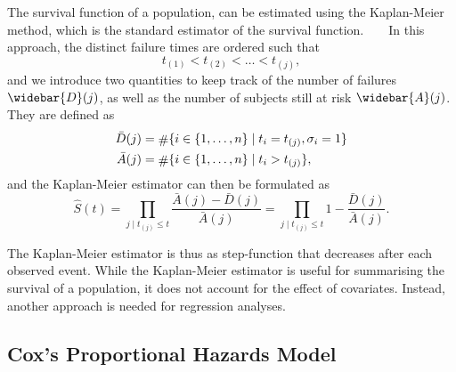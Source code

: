 The survival function of a population,
can be estimated using the Kaplan-Meier method,
which is the standard estimator of the survival function.
~\autocite{kaplan1958nonparametric}
~\autocite{kleinSurvival2003}
In this approach, 
the distinct failure times are ordered such that%
\footnotemark
\begin{equation*}
    t_{(1)} < t_{(2)} < \ldots < t_{(j)},
\end{equation*}
%
and we introduce two quantities to keep track of
the number of failures \(\widebar{D}(j)\), 
as well as the number of subjects still at risk \(\widebar{A}(j)\).
They are defined as
\begin{equation}
\begin{aligned}
    \bar{D}(j) &= \card \{i \in \{1, \dots, n\} \mid t_i = t_{(j)}, \sigma_i = 1\} \\
    \bar{A}(j) &= \card \{i \in \{1, \dots, n\} \mid t_i > t_{(j)}\},
\end{aligned}
\end{equation}
and the Kaplan-Meier estimator can then be formulated as 
\begin{equation}
    \widehat{S}(t)
    =   \prod_{j \mid t_{(j)} \leq t} 
        \frac{
            \bar{A}(j) -
            \bar{D}(j)
        }{
            \bar{A}(j)
        }
    =   \prod_{j \mid t_{(j)} \leq t} 
        1 - \frac{
            \bar{D}(j)
        }{
            \bar{A}(j)
        }.
\end{equation}


The Kaplan-Meier estimator is thus as step-function that decreases
after each observed event.
While the Kaplan-Meier estimator is useful 
for summarising the survival of a population, 
it does not account for the effect of covariates.
Instead, another approach is needed for regression analyses.

\subsection{Cox's Proportional Hazards Model}

